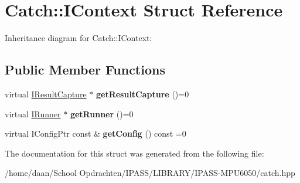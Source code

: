 \hypertarget{structCatch_1_1IContext}{}\section{Catch\+:\+:I\+Context Struct Reference}
\label{structCatch_1_1IContext}


Inheritance diagram for Catch\+:\+:I\+Context\+:
\subsection*{Public Member Functions}
\begin{DoxyCompactItemize}
\item 
\mbox{\label{structCatch_1_1IContext_a684e4ae71d1fdf3060c352ecde1d122f}} 
virtual \hyperlink{structCatch_1_1IResultCapture}{I\+Result\+Capture} $\ast$ {\bfseries get\+Result\+Capture} ()=0
\item 
\mbox{\label{structCatch_1_1IContext_af088415dde18d039ed5a2f95b02767c6}} 
virtual \hyperlink{structCatch_1_1IRunner}{I\+Runner} $\ast$ {\bfseries get\+Runner} ()=0
\item 
\mbox{\label{structCatch_1_1IContext_a72a2718232adea8925fec9e71d3efd75}} 
virtual I\+Config\+Ptr const  \& {\bfseries get\+Config} () const =0
\end{DoxyCompactItemize}


The documentation for this struct was generated from the following file\+:\begin{DoxyCompactItemize}
\item 
/home/daan/\+School Opdrachten/\+I\+P\+A\+S\+S/\+L\+I\+B\+R\+A\+R\+Y/\+I\+P\+A\+S\+S-\/\+M\+P\+U6050/catch.\+hpp\end{DoxyCompactItemize}
